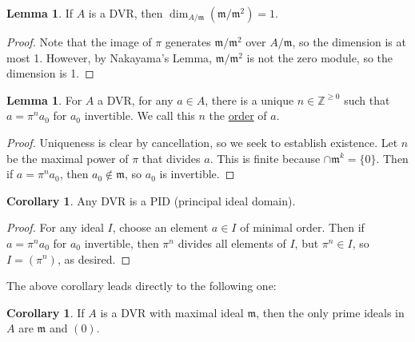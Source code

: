 \documentclass[12 pt]{article}
\theoremstyle{definition}
\newtheorem{corollary}[theorem]{Corollary}
\newtheorem{lemma}[theorem]{Lemma}
\newcommand\zz{\mathbb{Z}}
\begin{document}
\begin{lemma} If $A$ is a DVR, then $\dim_{A/\mathfrak{m}}(\mathfrak{m}/\mathfrak{m}^2)=1$.
\end{lemma}
\begin{proof} Note that the image of $\pi$ generates $\mathfrak{m}/\mathfrak{m}^2$ over $A/\mathfrak{m}$, so the dimension is at most 1. However, by Nakayama's Lemma, $\mathfrak{m}/\mathfrak{m}^2$ is not the zero module, so the dimension is 1.
\end{proof}

\begin{lemma} For $A$ a DVR, for any $a \in A$, there is a unique $n \in \zz^{\geq 0}$ such that $a=\pi^na_0$ for $a_0$ invertible. We call this $n$ the \uline{order} of $a$.
\end{lemma}
\begin{proof} Uniqueness is clear by cancellation, so we seek to establish existence. Let $n$ be the maximal power of $\pi$ that divides $a$. This is finite because $\cap \mathfrak{m}^k=\{0\}$. Then if $a=\pi^na_0$, then $a_0 \not \in \mathfrak{m}$, so $a_0$ is invertible.
\end{proof}

\begin{corollary} Any DVR is a PID (principal ideal domain).
\label{DVR is PID}
\end{corollary}
\begin{proof} For any ideal $I$, choose an element $a \in I$ of minimal order. Then if $a=\pi^n a_0$ for $a_0$ invertible, then $\pi^n$ divides all elements of $I$, but $\pi^n \in I$, so $I=(\pi^n)$, as desired.
\end{proof}

The above corollary leads directly to the following one:

\begin{corollary} If $A$ is a DVR with maximal ideal $\mathfrak{m}$, then the only prime ideals in $A$ are $\mathfrak{m}$ and $(0)$.
\end{corollary}
\end{document}

